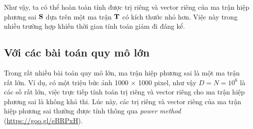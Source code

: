 Như vậy, ta có thể hoàn toàn tính được trị riêng và vector riêng của ma trận
hiệp phương sai $\mathbf{S}$ dựa trên một ma trận $\mathbf{T}$ có kích thước nhỏ hơn. Việc
này trong nhiều trường hợp khiến thời gian tính toán giảm đi đáng kể.








\subsection{Với các bài toán quy mô lớn}
Trong rất nhiều bài toán quy mô lớn, ma trận hiệp phương sai là một ma trận rất lớn. Ví dụ, có một triệu bức ảnh
1000 $\times$ 1000 pixel, như vậy $D = N = 10^6$ là các số rất lớn, việc trực
tiếp tính toán trị riêng và vector riêng cho ma trận hiệp phương sai là không
khả thi. Lúc này, các trị riêng và vector riêng của ma trận hiệp phương sai thường được tính thông qua \textit{power method}
(\url{https://goo.gl/eBRPxH}).

